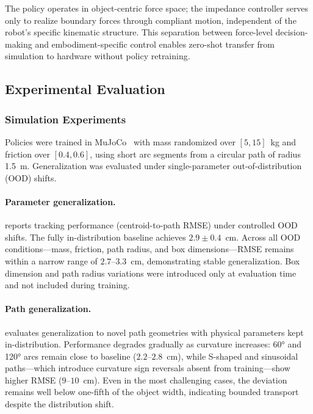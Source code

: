 The policy operates in object-centric force space; the impedance controller serves only to realize boundary forces through compliant motion, independent of the robot's specific kinematic structure. This separation between force-level decision-making and embodiment-specific control enables zero-shot transfer from simulation to hardware without policy retraining.


\subsection{Experimental Evaluation}
\label{sec:pho_results}

\subsubsection{Simulation Experiments}

Policies were trained in MuJoCo~\citep{todorov2012mujoco} with mass randomized over $[5, 15]$~kg and friction over $[0.4, 0.6]$, using short arc segments from a circular path of radius 1.5~m. Generalization was evaluated under single-parameter out-of-distribution (OOD) shifts.

\paragraph{Parameter generalization.}  reports tracking performance (centroid-to-path RMSE) under controlled OOD shifts. The fully in-distribution baseline achieves $2.9 \pm 0.4$~cm. Across all OOD conditions---mass, friction, path radius, and box dimensions---RMSE remains within a narrow range of $2.7$--$3.3$~cm, demonstrating stable generalization. Box dimension and path radius variations were introduced only at evaluation time and not included during training.




\paragraph{Path generalization.}  evaluates generalization to novel path geometries with physical parameters kept in-distribution. Performance degrades gradually as curvature increases: 60° and 120° arcs remain close to baseline ($2.2$--$2.8$~cm), while S-shaped and sinusoidal paths---which introduce curvature sign reversals absent from training---show higher RMSE ($9$--$10$~cm). Even in the most challenging cases, the deviation remains well below one-fifth of the object width, indicating bounded transport despite the distribution shift.

